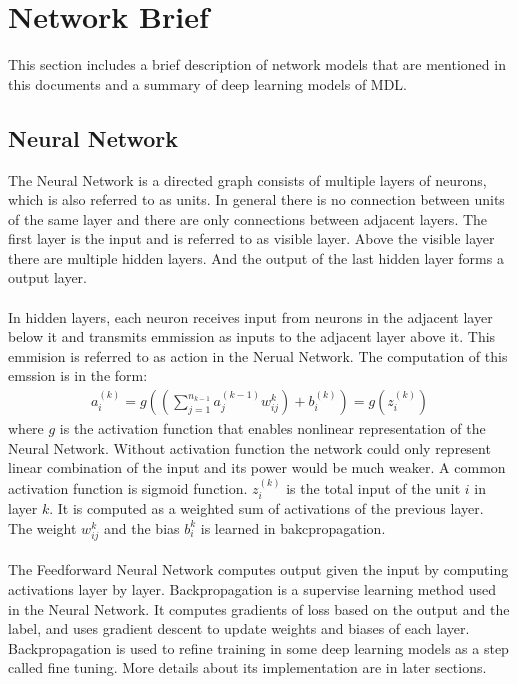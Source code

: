 \documentclass[12pt]{article}
\begin{document}
\section{Network Brief}
This section includes a brief description of network models that are mentioned in this documents and a summary of deep learning models of MDL.
\subsection{Neural Network}
The Neural Network is a directed graph consists of multiple layers of neurons, which is also referred to as units. In general there is no connection between units of the same layer and there are only connections between adjacent layers. The first layer is the input and is referred to as visible layer. Above the visible layer there are multiple hidden layers. And the output of the last hidden layer forms a output layer.\\
\\
In hidden layers, each neuron receives input from neurons in the adjacent layer below it and transmits emmission as inputs to the adjacent layer above it. This emmision is referred to as action in the Nerual Network. The computation of this emssion is in the form:\begin{gather}
a^{(k)}_i = g((\sum_{j=1}^{n_{k-1}}a^{(k-1)}_jw^{k}_{ij})+b^{(k)}_i)=g(z^{(k)}_i)
\end{gather}
where $g$ is the activation function that enables nonlinear representation of the Neural Network. Without activation function the network could only represent linear combination of the input and its power would be much weaker. A common activation function is sigmoid function. $z^{(k)}_i$ is the total input of the unit $i$ in layer $k$. It is computed as a weighted sum of activations of the previous layer. The weight $w^{k}_{ij}$ and the bias $b^k_i$ is learned in bakcpropagation.\\
\\
The Feedforward Neural Network computes output given the input by computing activations layer by layer. Backpropagation is a supervise learning method used in the Neural Network. It computes gradients of loss based on the output and the label, and uses gradient descent to update weights and biases of each layer. Backpropagation is used to refine training in some deep learning models as a step called fine tuning. More details about its implementation are in later sections.
\end{document}
